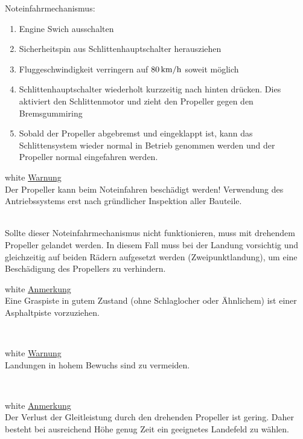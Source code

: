 Noteinfahrmechanismus:
\begin{enumerate}
\item Engine Swich ausschalten
\item Sicherheitspin aus Schlittenhauptschalter herausziehen
\item Fluggeschwindigkeit verringern auf $\unit[80]{km/h}$ soweit möglich
\item Schlittenhauptschalter wiederholt kurzzeitig nach hinten drücken. Dies aktiviert den Schlittenmotor und zieht den Propeller gegen den Bremsgummiring
\item Sobald der Propeller abgebremst und eingeklappt ist, kann das Schlittensystem wieder normal in Betrieb genommen werden und der Propeller normal eingefahren werden.
\end{enumerate}

\begin{color}{white}
\large{\underline{Warnung}}\\
Der Propeller kann beim Noteinfahren beschädigt werden! Verwendung des Antriebssystems erst nach gründlicher Inspektion aller Bauteile.
\end{color}\\

Sollte dieser Noteinfahrmechanismus nicht funktionieren, muss mit drehendem Propeller gelandet werden. In diesem Fall muss bei der Landung vorsichtig und gleichzeitig auf beiden Rädern aufgesetzt werden (Zweipunktlandung), um eine Beschädigung des Propellers zu verhindern.\\

\begin{color}{white}
\large{\underline{Anmerkung}}\\
Eine Graspiste in gutem Zustand (ohne Schlaglocher oder Ähnlichem) ist einer Asphaltpiste vorzuziehen.
\end{color}\\

\begin{color}{white}
\large{\underline{Warnung}}\\
Landungen in hohem Bewuchs sind zu vermeiden.
\end{color}\\

\begin{color}{white}
\large{\underline{Anmerkung}}\\
Der Verlust der Gleitleistung durch den drehenden Propeller ist gering. Daher besteht bei ausreichend Höhe genug Zeit ein geeignetes Landefeld zu wählen.
\end{color}\\

